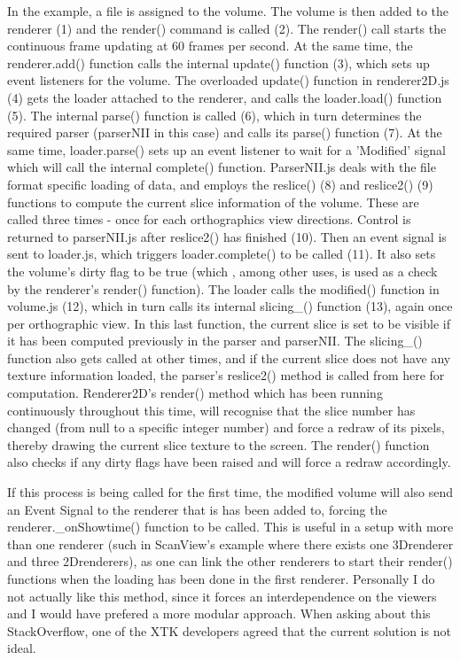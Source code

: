 \documentclass[a4paper,11pt,titlepage]{article}
\begin{document}
In the example, a file is assigned to the volume. The volume is then added to the renderer (1) and the render() command is called (2). The render() call starts the continuous frame updating at 60 frames per second. At the same time, the renderer.add() function calls the internal update() function (3), which sets up event listeners for the volume. The overloaded update() function in renderer2D.js (4) gets the loader attached to the renderer, and calls the loader.load() function (5). The internal parse() function is called (6), which in turn determines the required parser (parserNII in this case) and calls its parse() function (7). At the same time, loader.parse() sets up an event listener to wait for a 'Modified' signal which will call the internal complete() function. ParserNII.js deals with the file format specific loading of data, and employs the reslice() (8) and reslice2() (9) functions to compute the current slice information of the volume. These are called three times - once for each orthographics view directions. Control is returned to parserNII.js after reslice2() has finished (10). Then an event signal is sent to loader.js, which triggers loader.complete() to be called (11). It also sets the volume's dirty flag to be true (which , among other uses, is used as a check by the renderer's render() function). The loader calls the modified() function in volume.js (12), which in turn calls its internal slicing\_() function (13), again once per orthographic view. In this last function, the current slice is set to be visible if it has been computed previously in the parser and parserNII. The slicing\_() function also gets called at other times, and if the current slice does not have any texture information loaded, the parser's reslice2() method is called from here for computation. Renderer2D's render() method which has been running continuously throughout this time, will recognise that the slice number has changed (from null to a specific integer number) and force a redraw of its pixels, thereby drawing the current slice texture to the screen. The render() function also checks if any dirty flags have been raised and will force a redraw accordingly.

If this process is being called for the first time, the modified volume will also send an Event Signal to the renderer that is has been added to, forcing the renderer.\_onShowtime() function to be called. This is useful in a setup with more than one renderer (such in ScanView's example where there exists one 3Drenderer and three 2Drenderers), as one can link the other renderers to start their render() functions when the loading has been done in the first renderer. Personally I do not actually like this method, since it forces an interdependence on the viewers and I would have prefered a more modular approach. When asking about this StackOverflow, one of the XTK developers agreed that the current solution is not ideal.
\end{document}
